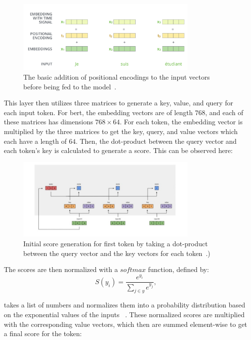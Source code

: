 \documentclass[12pt]{article}
\begin{document}
\begin{figure}[h]
\centering
\includegraphics[width=0.8\textwidth]{fig/positional_encodings.png}
\caption{The basic addition of positional encodings to the input vectors before being fed to the model~\parencite{alammar_2018}.
}
\label{fig:positional_encodings}
\end{figure}

This layer then utilizes three matrices to generate a key, value, and query for each input token. For \acrshort{bert}, the embedding vectors are of length $768$, and each of these matrices has dimensions $768 \times 64$. For each token, the embedding vector is multiplied by the three matrices to get the key, query, and value vectors which each have a length of $64$. Then, the dot-product between the query vector and each token’s key is calculated to generate a score. This can be observed here:

\begin{figure}[h]
\centering
\includegraphics[width=0.8\textwidth]{fig/first_encoder_step.jpg}
\caption{Initial score generation for first token by taking a dot-product between the query vector and the key vectors for each token~\parencite{karim_2019}.)
}
\label{fig:first_encoder_step}
\end{figure}

The scores are then normalized with a $softmax$ function, defined by:
\begin{equation}
\label{eq:softmax}
S(y_i) = \frac{e^{y_i}}{\sum_{j\in y}e^{y_j}}, 
\end{equation}

 takes a list of numbers and normalizes them into a probability distribution based on the exponential values of the inputs ~\parencite{bengio_goodfellow_courville_2017}. These normalized scores are multiplied with the corresponding value vectors, which then are summed element-wise to get a final score for the token:
\end{document}
